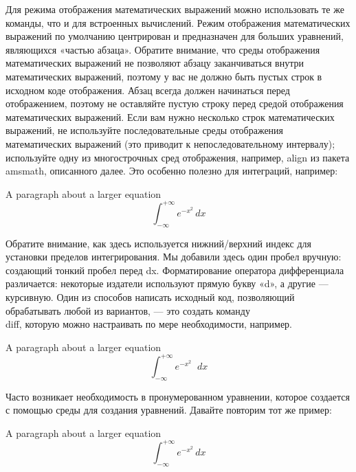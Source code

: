 \documentclass[leqno]{article}
\begin{document}
  Для режима отображения математических выражений можно использовать те же команды, что и для встроенных вычислений.
  Режим отображения математических выражений по умолчанию центрирован и предназначен для больших уравнений,
  являющихся «частью абзаца». Обратите внимание, что среды отображения математических выражений не позволяют абзацу заканчиваться внутри математических выражений, поэтому у вас не должно быть пустых строк в исходном коде отображения.
  Абзац всегда должен начинаться перед отображением, поэтому не оставляйте пустую строку перед средой отображения математических выражений. Если вам нужно несколько строк математических выражений,
  не используйте последовательные среды отображения математических выражений (это приводит к непоследовательному
  интервалу); используйте одну из многострочных сред отображения, например, align из пакета
  amsmath, описанного далее.
  Это особенно полезно для интеграций, например:

  \begin{center}
    A paragraph about a larger equation
    \[
    \int_{-\infty}^{+\infty} e^{-x^2} \, dx
    \]
  \end{center}

  Обратите внимание, как здесь используется нижний/верхний индекс для установки пределов интегрирования.
  Мы добавили здесь один пробел вручную: \, создающий тонкий пробел перед
  dx. Форматирование оператора дифференциала различается: некоторые издатели используют прямую букву «d», 
  а другие — курсивную. Один из способов написать исходный код, позволяющий обрабатывать любой из вариантов, — 
  это создать команду \\diff, которую можно настраивать по мере необходимости, например.

  \smallskip

  \newcommand{\diff}{\mathop{}\!d} %
  \begin{center}
  A paragraph about a larger equation
  \[
  \int_{-\infty}^{+\infty} e^{-x^2} \diff x
  \]
  \end{center}


  Часто возникает необходимость в пронумерованном уравнении, которое создается с помощью среды для создания уравнений. Давайте повторим тот же пример:


  \begin{center}
    A paragraph about a larger equation
    \begin{equation}
    \int_{-\infty}^{+\infty} e^{-x^2} \, dx
    \end{equation}
  \end{center}
\end{document}
